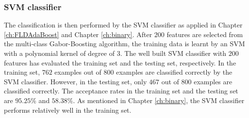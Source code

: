 \subsubsection{SVM classifier}
The classification is then performed by the SVM classifier as applied in \mbox{Chapter} \ref{ch:FLDAdaBoost} and \mbox{Chapter} \ref{ch:binary}. After $200$ features are selected from the multi-class Gabor-Boosting algorithm, the training data is learnt by an SVM with a polynomial kernel of degree of $3$. The well built SVM classifier with $200$ features has evaluated the training set and the testing set, respectively. In the training set, $762$ examples out of $800$ examples are classified correctly by the SVM classifier. However, in the testing set, only $467$ out of $800$ examples are classified correctly. The acceptance rates in the training set and the testing set are $95.25\%$ and $58.38\%$. As mentioned in \mbox{Chapter} \ref{ch:binary}, the SVM classifier performs relatively well in the training set.

